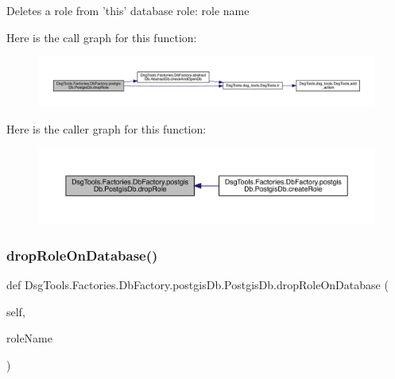\begin{DoxyVerb}Deletes a role from 'this' database
role: role name
\end{DoxyVerb}
 Here is the call graph for this function\+:
\nopagebreak
\begin{figure}[H]
\begin{center}
\leavevmode
\includegraphics[width=350pt]{class_dsg_tools_1_1_factories_1_1_db_factory_1_1postgis_db_1_1_postgis_db_ac16f37ab02190784d2fcc3dab44bef43_cgraph}
\end{center}
\end{figure}
Here is the caller graph for this function\+:
\nopagebreak
\begin{figure}[H]
\begin{center}
\leavevmode
\includegraphics[width=350pt]{class_dsg_tools_1_1_factories_1_1_db_factory_1_1postgis_db_1_1_postgis_db_ac16f37ab02190784d2fcc3dab44bef43_icgraph}
\end{center}
\end{figure}
\mbox{\label{class_dsg_tools_1_1_factories_1_1_db_factory_1_1postgis_db_1_1_postgis_db_a954277357ca99e90691f346044ed3a91}} 
\subsubsection{\texorpdfstring{drop\+Role\+On\+Database()}{dropRoleOnDatabase()}}
{\footnotesize\ttfamily def Dsg\+Tools.\+Factories.\+Db\+Factory.\+postgis\+Db.\+Postgis\+Db.\+drop\+Role\+On\+Database (\begin{DoxyParamCaption}\item[{}]{self,  }\item[{}]{role\+Name }\end{DoxyParamCaption})}


